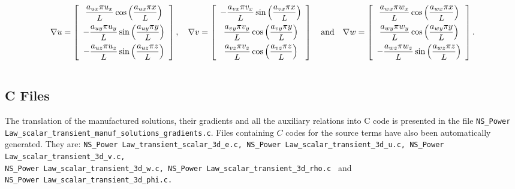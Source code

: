 \documentclass[10pt]{article}
\begin{document}
\begin{equation*}
\nabla u = \left[ \begin{array}{c}
  \dfrac{  a_{ux}  \pi u_x}{L} \cos\left( \dfrac{ a_{ux}  \pi  x}{L}\right)\vspace{5pt}\\
 -   \dfrac{  a_{uy}  \pi u_y}{L} \sin\left( \dfrac{ a_{uy}  \pi  y}{L}\right)\vspace{5pt}\\
 -   \dfrac{  a_{uz}  \pi u_z}{L} \sin\left( \dfrac{ a_{uz}  \pi  z}{L}\right)
\end{array} \right],
\quad
\nabla  v= \left[ \begin{array}{c}
-  \dfrac{  a_{vx}  \pi v_x}{L}  \sin\left( \dfrac{ a_{vx}  \pi  x}{L}\right)\vspace{5pt}\\
    \dfrac{  a_{vy}  \pi v_y}{L} \cos\left( \dfrac{ a_{vy}  \pi  y}{L}\right)\vspace{5pt}\\
   \dfrac{  a_{vz}  \pi v_z }{L} \cos\left( \dfrac{ a_{vz}  \pi  z}{L}\right)
\end{array} \right]
\quad\mbox{and}\quad
\nabla w = \left[ \begin{array}{c}
\dfrac{  a_{wx}  \pi  w_x}{L} \cos\left( \dfrac{ a_{wx}  \pi  x}{L}\right)\vspace{5pt}\\
  \dfrac{  a_{wy}  \pi w_y}{L}  \cos\left( \dfrac{ a_{wy}  \pi  y}{L}\right)\vspace{5pt} \\
 - \dfrac{  a_{wz}  \pi w_z}{L}  \sin\left( \dfrac{ a_{wz}  \pi  z}{L}\right)
\end{array} \right].
\end{equation*}

$$$$

\subsection{C Files}

The translation of the manufactured solutions, their gradients and all the auxiliary relations into C code is presented in the file \texttt{NS\_Power Law\_scalar\_transient\_manuf\_solutions\_gradients.c}. Files containing $C$ codes for the source terms have also been automatically generated. They are: \texttt{NS\_Power Law\_transient\_scalar\_3d\_e.c, NS\_Power Law\_scalar\_transient\_3d\_u.c, NS\_Power Law\_scalar\_transient\_3d\_v.c,\\ NS\_Power Law\_scalar\_transient\_3d\_w.c, NS\_Power Law\_scalar\_transient\_3d\_rho.c } and\\ \texttt{NS\_Power Law\_scalar\_transient\_3d\_phi.c.}
\end{document}
